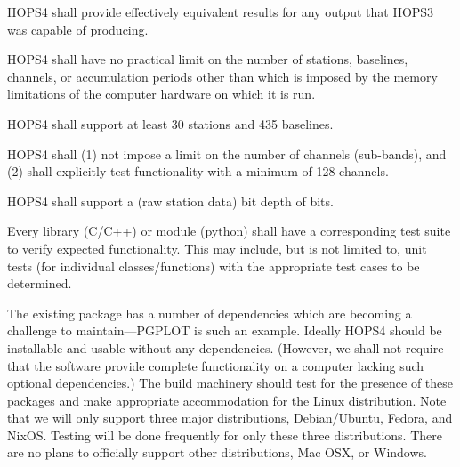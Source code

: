 \begin{description}

 HOPS4 shall provide effectively equivalent results for any output that HOPS3 was capable of producing.

 HOPS4 shall have no practical limit on the number of stations,
baselines, channels, or accumulation periods other than which is imposed by the
memory limitations of the computer hardware on which it is run.


 HOPS4 shall support at least 30 stations and 435 baselines.

 HOPS4 shall (1) not impose a limit on the number of channels (sub-bands), and (2) shall explicitly test functionality with a minimum of 128 channels.

 HOPS4 shall support a (raw station data) bit depth of \FIX[2] bits.

 Every library (C/C++) or module (python) shall have a corresponding
test suite to verify expected functionality. This may include, but is not limited
to, unit tests (for individual classes/functions) with the appropriate test
cases to be determined.


\end{description}

The existing package has a number of dependencies which are becoming
a challenge to maintain---\acs{PGPLOT} is such an example.  Ideally
HOPS4 should be installable and usable without any dependencies.
(However, we shall not require that the software provide complete functionality
on a computer lacking such optional dependencies.) The build machinery should test
for the presence of these packages and make appropriate accommodation for
the Linux distribution. Note that we will only support three major distributions,
Debian/Ubuntu, Fedora, and NixOS. Testing will be done frequently for only these
three distributions. There are no plans to officially support other distributions,
Mac OSX, or Windows.

